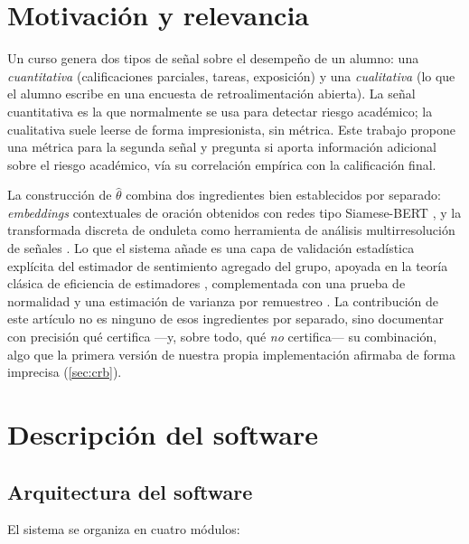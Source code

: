 \documentclass[11pt,a4paper,oneside]{article}
\theoremstyle{definition}
\begin{document}
\section{Motivación y relevancia}
\label{sec:motivacion}

Un curso genera dos tipos de señal sobre el desempeño de un alumno: una \emph{cuantitativa}
(calificaciones parciales, tareas, exposición) y una \emph{cualitativa} (lo que el alumno
escribe en una encuesta de retroalimentación abierta). La señal cuantitativa es la que
normalmente se usa para detectar riesgo académico; la cualitativa suele leerse de forma
impresionista, sin métrica. Este trabajo propone una métrica para la segunda señal y pregunta si
aporta información adicional sobre el riesgo académico, vía su correlación empírica con la
calificación final.

La construcción de $\hat\theta$ combina dos ingredientes bien establecidos por separado:
\emph{embeddings} contextuales de oración obtenidos con redes tipo Siamese-BERT
\cite{ReimersGurevych2019}, y la transformada discreta de onduleta como herramienta de análisis
multirresolución de señales \cite{Mallat1989}. Lo que el sistema añade es una capa de validación
estadística explícita del estimador de sentimiento agregado del grupo, apoyada en la teoría
clásica de eficiencia de estimadores \cite{Fisher1922,Rao1945,Cramer1946}, complementada con una
prueba de normalidad \cite{ShapiroWilk1965} y una estimación de varianza por remuestreo
\cite{Efron1979}. La contribución de este artículo no es ninguno de esos ingredientes por
separado, sino documentar con precisión qué certifica —y, sobre todo, qué \emph{no} certifica—
su combinación, algo que la primera versión de nuestra propia implementación afirmaba de forma
imprecisa (\cref{sec:crb}).

\section{Descripción del software}
\label{sec:descripcion}

\subsection{Arquitectura del software}
\label{sec:arquitectura}

El sistema se organiza en cuatro módulos:
\end{document}
